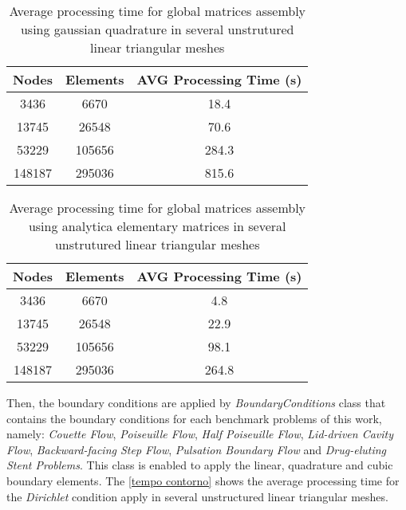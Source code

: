 \vspace{0.5cm}
\begin{table}[H]
\centering
\begin{tabular}{ccc}
\toprule
\textbf{Nodes} & \textbf{Elements} & \textbf{AVG Processing Time} (s) \\
\midrule
3436 & 6670 & 18.4 \\
13745 & 26548 & 70.6 \\
53229 & 105656 & 284.3 \\
148187 & 295036 & 815.6 \\



\bottomrule
\end{tabular}
\caption{Average processing time for global matrices assembly using gaussian quadrature in several unstrutured linear triangular meshes}
\label{tempo matrizes globais gauss}
\end{table}

\vspace{0.5cm}
\begin{table}[H]
\centering
\begin{tabular}{ccc}
\toprule
\textbf{Nodes} & \textbf{Elements} & \textbf{AVG Processing Time} (s) \\
\midrule
3436 & 6670 & 4.8 \\
13745 & 26548 & 22.9 \\
53229 & 105656 & 98.1 \\
148187 & 295036 & 264.8 \\



\bottomrule
\end{tabular}
\caption{Average processing time for global matrices assembly using analytica elementary matrices in several unstrutured linear triangular meshes}
\label{tempo matrizes globais gauss}
\end{table}



\medskip
Then, the boundary conditions are applied by \textit{BoundaryConditions} class
that contains the boundary conditions
for each benchmark problems of this
work, namely:
\textit{Couette Flow}, 
\textit{Poiseuille Flow}, 
\textit{Half Poiseuille Flow}, 
\textit{Lid-driven Cavity Flow}, 
\textit{Backward-facing Step Flow}, 
\textit{Pulsation Boundary Flow} and
\textit{Drug-eluting Stent Problems}. 
This class is enabled to apply 
the linear, quadrature and cubic boundary elements.
The \ref{tempo contorno} 
shows the average processing time for the \textit{Dirichlet} 
condition apply in several unstructured linear triangular meshes.

